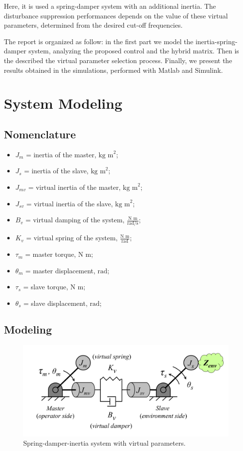 Here, it is used a spring-damper system with an additional inertia.
The disturbance suppression performances depends on the value of these virtual parameters, determined from the desired cut-off frequencies.

The report is organized as follow: in the first part we model the inertia-spring-damper system, analyzing the proposed control and the hybrid matrix. Then is the described the virtual parameter selection process. Finally, we present the results obtained in the simulations, performed with Matlab and Simulink.

\section{System Modeling}

\subsection*{Nomenclature}

\begin{itemize}
	\item $ J_m $ = inertia of the master, $ \text{kg m}^2 $;
	\item $ J_s $ = inertia of the slave,  $ \text{kg m}^2 $;
	\item $ J_{mv} $ = virtual inertia of the master,  $ \text{kg m}^2 $;
	\item $ J_{sv} $ = virtual inertia of the slave,  $ \text{kg m}^2 $;
	\item $ B_v $ = virtual damping of the system, $ \frac{\text{N m}}{\text{rad/s}} $;
	\item $ K_v $ = virtual spring of the system, $ \frac{\text{N m}}{\text{rad}} $;
	\item $ \tau_m $ = master torque, $ \text{N m} $;
	\item $ \theta_m $ = master displacement, $ \text{rad} $; 
	\item $ \tau_s $ = slave torque, $ \text{N m} $;
	\item $ \theta_s $ = slave displacement, $ \text{rad} $;
\end{itemize}

\subsection*{Modeling}

\begin{figure}[h]
	\centering
	\includegraphics[width=0.7\linewidth]{Images/spring_damper_inertia_system}
	\caption{Spring-damper-inertia system with virtual parameters.}
	\label{fig:springdamperinertiasystem}
\end{figure}


